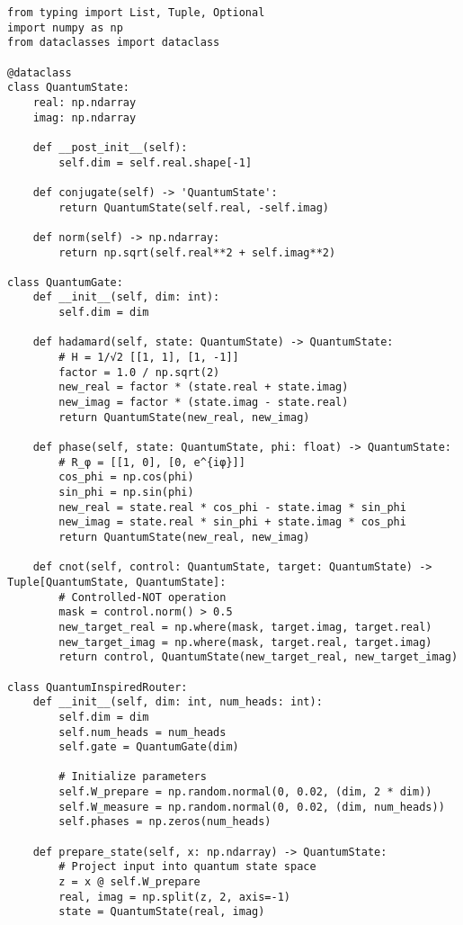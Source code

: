 \documentclass[10pt]{article}
\begin{document}
\begin{verbatim}
from typing import List, Tuple, Optional
import numpy as np
from dataclasses import dataclass

@dataclass
class QuantumState:
    real: np.ndarray
    imag: np.ndarray
    
    def __post_init__(self):
        self.dim = self.real.shape[-1]
        
    def conjugate(self) -> 'QuantumState':
        return QuantumState(self.real, -self.imag)
    
    def norm(self) -> np.ndarray:
        return np.sqrt(self.real**2 + self.imag**2)

class QuantumGate:
    def __init__(self, dim: int):
        self.dim = dim
        
    def hadamard(self, state: QuantumState) -> QuantumState:
        # H = 1/√2 [[1, 1], [1, -1]]
        factor = 1.0 / np.sqrt(2)
        new_real = factor * (state.real + state.imag)
        new_imag = factor * (state.imag - state.real)
        return QuantumState(new_real, new_imag)
    
    def phase(self, state: QuantumState, phi: float) -> QuantumState:
        # R_φ = [[1, 0], [0, e^{iφ}]]
        cos_phi = np.cos(phi)
        sin_phi = np.sin(phi)
        new_real = state.real * cos_phi - state.imag * sin_phi
        new_imag = state.real * sin_phi + state.imag * cos_phi
        return QuantumState(new_real, new_imag)
    
    def cnot(self, control: QuantumState, target: QuantumState) -> Tuple[QuantumState, QuantumState]:
        # Controlled-NOT operation
        mask = control.norm() > 0.5
        new_target_real = np.where(mask, target.imag, target.real)
        new_target_imag = np.where(mask, target.real, target.imag)
        return control, QuantumState(new_target_real, new_target_imag)

class QuantumInspiredRouter:
    def __init__(self, dim: int, num_heads: int):
        self.dim = dim
        self.num_heads = num_heads
        self.gate = QuantumGate(dim)
        
        # Initialize parameters
        self.W_prepare = np.random.normal(0, 0.02, (dim, 2 * dim))
        self.W_measure = np.random.normal(0, 0.02, (dim, num_heads))
        self.phases = np.zeros(num_heads)
        
    def prepare_state(self, x: np.ndarray) -> QuantumState:
        # Project input into quantum state space
        z = x @ self.W_prepare
        real, imag = np.split(z, 2, axis=-1)
        state = QuantumState(real, imag)
        

\end{verbatim}
\end{document}

